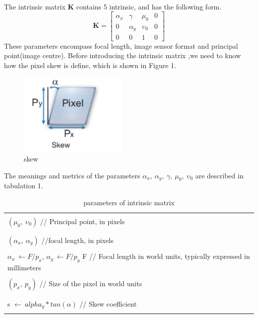 \documentclass{article}
\begin{document}
\paragraph{} The intrinsic matrix \textbf{K} contains 5 intrinsic, and has the following form.
\begin{equation}
\mathbf{K}= \left[\begin{array}{cccc}
\alpha_x & \gamma & \mu_0 & 0\\
0 & \alpha_y & \upsilon_0 & 0\\
0 & 0 & 1 & 0
\end{array}
\right]
\end{equation}
These parameters encompass focal length, image sensor format and principal point(image centre). Before introducing the intrinsic matrix ,we need to know how the pixel skew is define, which is shown in Figure 1\cite{Intrinsic}.
\begin{figure}[H]
\centering
\includegraphics[scale=0.5]{1.png}
\caption{skew}
\label{fig:label}
\end{figure}
The meanings and metrics of the parameters $\alpha_x,\ \alpha_y,\ \gamma,\ \mu_0,\ \upsilon_0$ are described in tabulation 1\cite{CameraResectioning}\cite{Intrinsic}.
\\
\begin{table}[H]
\centering
\begin{tabular}{|l|}
\hline
\\
$(\mu_0,\ \upsilon_0)$ // Principal point, in pixels\\
\\
\hline
\\
$(\alpha_x,\ \alpha_y)$ //focal length, in pixels\\
\\
$\alpha_x \ \gets F / p_x$, $\alpha_y \ \gets F / p_y$
F // Focal length in world units, typically expressed in millimeters\\
\\
$(p_x,\ p_y)$  //  Size of the pixel in world units \\
\\
\hline
\\
s $\gets \ alpha_y * tan(\alpha)$  //  Skew coefficient\\
\\
\hline
\end{tabular}
\caption{parameters of intrinsic matrix}
\label{tab:label}
\end{table}
\end{document}
